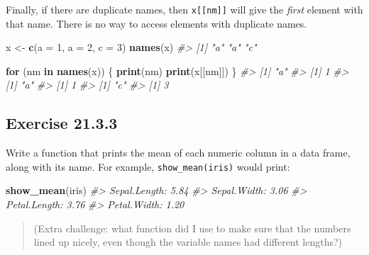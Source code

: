 \documentclass[]{book}
\newenvironment{Shaded}{\begin{snugshade}}{\end{snugshade}}
\newcommand{\CommentTok}[1]{\textcolor[rgb]{0.56,0.35,0.01}{\textit{#1}}}
\newcommand{\ControlFlowTok}[1]{\textcolor[rgb]{0.13,0.29,0.53}{\textbf{#1}}}
\newcommand{\DataTypeTok}[1]{\textcolor[rgb]{0.13,0.29,0.53}{#1}}
\newcommand{\DecValTok}[1]{\textcolor[rgb]{0.00,0.00,0.81}{#1}}
\newcommand{\KeywordTok}[1]{\textcolor[rgb]{0.13,0.29,0.53}{\textbf{#1}}}
\newcommand{\NormalTok}[1]{#1}
\newcommand{\StringTok}[1]{\textcolor[rgb]{0.31,0.60,0.02}{#1}}
\theoremstyle{plain}
\theoremstyle{remark}
\theoremstyle{definition}
\theoremstyle{definition}
\theoremstyle{definition}
\theoremstyle{remark}
\begin{document}
Finally, if there are duplicate names, then \texttt{x{[}{[}nm{]}{]}}
will give the \emph{first} element with that name. There is no way to
access elements with duplicate names.

\begin{Shaded}
\begin{Highlighting}[]
\NormalTok{x <-}\StringTok{ }\KeywordTok{c}\NormalTok{(}\DataTypeTok{a =} \DecValTok{1}\NormalTok{, }\DataTypeTok{a =} \DecValTok{2}\NormalTok{, }\DataTypeTok{c =} \DecValTok{3}\NormalTok{)}
\KeywordTok{names}\NormalTok{(x)}
\CommentTok{#> [1] "a" "a" "c"}
\end{Highlighting}
\end{Shaded}

\begin{Shaded}
\begin{Highlighting}[]
\ControlFlowTok{for}\NormalTok{ (nm }\ControlFlowTok{in} \KeywordTok{names}\NormalTok{(x)) \{}
  \KeywordTok{print}\NormalTok{(nm)}
  \KeywordTok{print}\NormalTok{(x[[nm]])}
\NormalTok{\}}
\CommentTok{#> [1] "a"}
\CommentTok{#> [1] 1}
\CommentTok{#> [1] "a"}
\CommentTok{#> [1] 1}
\CommentTok{#> [1] "c"}
\CommentTok{#> [1] 3}
\end{Highlighting}
\end{Shaded}

\hypertarget{exercise-21.3.3}{%
\subsection*{\texorpdfstring{Exercise
{21.3.3}}{Exercise 21.3.3}}\label{exercise-21.3.3}}

Write a function that prints the mean of each numeric column in a data
frame, along with its name. For example, \texttt{show\_mean(iris)} would
print:

\begin{Shaded}
\begin{Highlighting}[]
\KeywordTok{show_mean}\NormalTok{(iris)}
\CommentTok{#> Sepal.Length: 5.84}
\CommentTok{#> Sepal.Width:  3.06}
\CommentTok{#> Petal.Length: 3.76}
\CommentTok{#> Petal.Width:  1.20}
\end{Highlighting}
\end{Shaded}

\begin{quote}
(Extra challenge: what function did I use to make sure that the numbers
lined up nicely, even though the variable names had different lengths?)
\end{quote}
\end{document}
